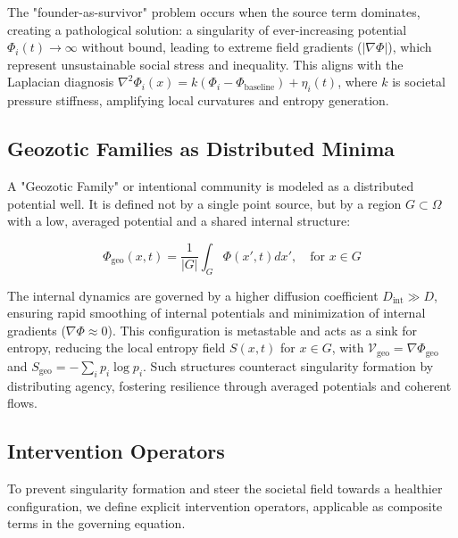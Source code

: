 \documentclass[11pt]{article}
\begin{document}
The "founder-as-survivor" problem occurs when the source term dominates, creating a pathological solution: a singularity of ever-increasing potential $\Phi_i(t) \rightarrow \infty$ without bound, leading to extreme field gradients ($|\nabla \Phi|$), which represent unsustainable social stress and inequality. This aligns with the Laplacian diagnosis $\nabla^2 \Phi_i(x) = k (\Phi_i - \Phi_{\text{baseline}}) + \eta_i(t)$, where $k$ is societal pressure stiffness, amplifying local curvatures and entropy generation.

\subsection{Geozotic Families as Distributed Minima}

A "Geozotic Family" or intentional community is modeled as a distributed potential well. It is defined not by a single point source, but by a region $G \subset \Omega$ with a low, averaged potential and a shared internal structure:

\begin{equation}
\Phi_{\text{geo}}(x, t) = \frac{1}{|G|} \int_G \Phi(x', t)  dx', \quad \text{for } x \in G
\end{equation}

The internal dynamics are governed by a higher diffusion coefficient $D_{\text{int}} \gg D$, ensuring rapid smoothing of internal potentials and minimization of internal gradients ($\nabla \Phi \approx 0$). This configuration is metastable and acts as a sink for entropy, reducing the local entropy field $S(x, t)$ for $x \in G$, with $\mathcal{V}_{\text{geo}} = \nabla \Phi_{\text{geo}}$ and $S_{\text{geo}} = - \sum_i p_i \log p_i$. Such structures counteract singularity formation by distributing agency, fostering resilience through averaged potentials and coherent flows.

\subsection{Intervention Operators}

To prevent singularity formation and steer the societal field towards a healthier configuration, we define explicit intervention operators, applicable as composite terms in the governing equation.
\end{document}
